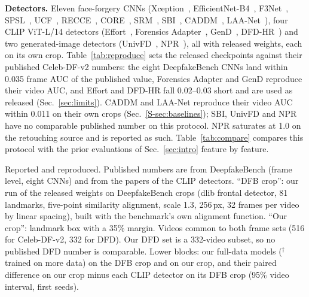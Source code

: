 \documentclass[journal]{IEEEtran}  %
\begin{document}
\textbf{Detectors.} Eleven face-forgery CNNs (Xception~\cite{xception}, EfficientNet-B4~\cite{efficientnet},
F3Net~\cite{f3net}, SPSL~\cite{spsl}, UCF~\cite{ucf}, RECCE~\cite{recce}, CORE~\cite{core}, SRM~\cite{srm}, SBI~\cite{sbi},
CADDM~\cite{caddm}, LAA-Net~\cite{laanet}), four CLIP ViT-L/14 detectors (Effort~\cite{effort}, Forensics
Adapter~\cite{forensicsadapter}, GenD~\cite{gend2026}, DFD-HR~\cite{dfdhr2026}) and two generated-image detectors
(UnivFD~\cite{univfd}, NPR~\cite{npr}), all with released weights, each on its own crop. Table~\ref{tab:reproduce} sets the released checkpoints against their published Celeb-DF-v2 numbers: the eight DeepfakeBench CNNs land within 0.035 frame AUC of the published value, Forensics Adapter and GenD reproduce their video AUC, and Effort and DFD-HR fall 0.02--0.03 short and are used as released (Sec.~\ref{sec:limits}). CADDM and LAA-Net reproduce their video AUC within 0.011 on their own crops (Sec.~\ref{S-sec:baselines}); SBI, UnivFD and NPR have no comparable published number on this protocol. NPR saturates at 1.0 on the
retouching source and is reported as such. Table~\ref{tab:compare} compares this protocol with the prior evaluations of Sec.~\ref{sec:intro} feature by feature.
\begin{table}[t]
\centering
\caption{Reported and reproduced. Published numbers are from DeepfakeBench (frame level, eight CNNs) and from the papers of the
CLIP detectors. ``DFB crop'': our run of the released weights on DeepfakeBench crops (dlib frontal detector, 81 landmarks,
five-point similarity alignment, scale 1.3, 256\,px, 32 frames per video by linear spacing), built with the benchmark's own
alignment function. ``Our crop'': landmark box with a 35\% margin. Videos common to both frame sets (516 for Celeb-DF-v2, 332 for
DFD). Our DFD set is a 332-video subset, so no published DFD number is comparable. Lower blocks: our full-data models
($^\dagger$trained on more data) on the DFB crop and on our crop, and their paired difference on our crop minus each CLIP
detector on its DFB crop (95\% video interval, first seeds).}
\label{tab:reproduce}
\footnotesize
\begin{adjustbox}{max width=\textwidth}\end{adjustbox}
\end{table}
\end{document}

